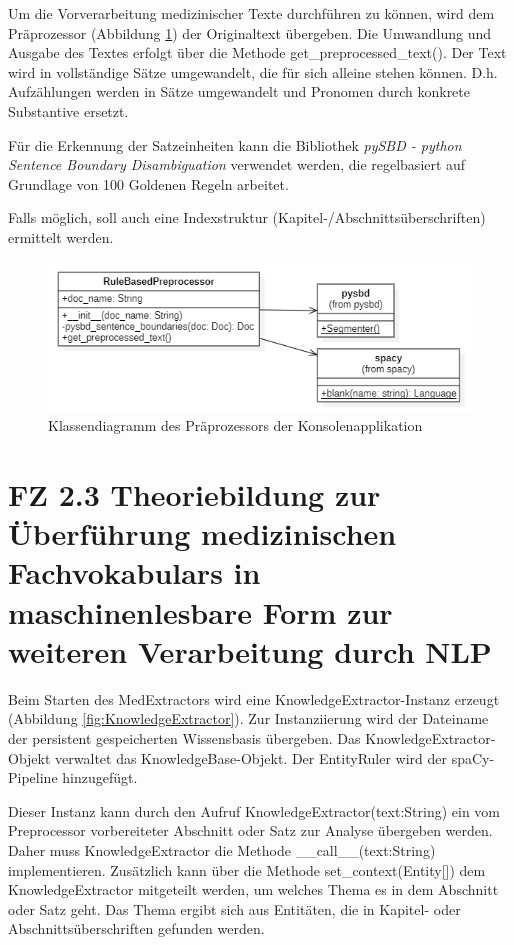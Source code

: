 Um die Vorverarbeitung medizinischer Texte durchführen zu können, wird dem Präprozessor (Abbildung \ref{fig:preprocessor}) der Originaltext übergeben. Die Umwandlung und Ausgabe des Textes erfolgt über die Methode get\_preprocessed\_text(). Der Text wird in vollständige Sätze umgewandelt, die für sich alleine stehen können. D.h. Aufzählungen werden in Sätze umgewandelt und Pronomen durch konkrete Substantive ersetzt. 

Für die Erkennung der Satzeinheiten kann die Bibliothek \emph{pySBD - python Sentence Boundary Disambiguation} verwendet werden, die regelbasiert auf Grundlage von 100 \glqq Goldenen Regeln\grqq{} arbeitet.

Falls möglich, soll auch eine Indexstruktur (Kapitel-/Abschnittsüberschrif\-ten) ermittelt werden.

\begin{figure}[h]
    \centering
    \includegraphics[width=\textwidth]{pictures/RuleBasedPreprocessor.png}
    \caption{Klassendiagramm des Präprozessors der Konsolenapplikation}
    \label{fig:preprocessor}
\end{figure}

\section[FZ 2.3 Theoriebildung zur Überf. med.Fachvokabulars]{FZ 2.3 Theoriebildung zur Überführung medizinischen Fachvokabulars in maschinenlesbare Form zur weiteren Verarbeitung durch NLP}
\label{sec:FZ2.3} 

Beim Starten des MedExtractors wird eine KnowledgeExtractor-Instanz erzeugt (Abbildung \ref{fig:KnowledgeExtractor}). Zur Instanziierung wird der Dateiname der persistent gespeicherten Wissensbasis übergeben. Das KnowledgeExtractor-Objekt verwaltet das KnowledgeBase-Objekt. Der EntityRuler wird der spaCy-Pipeline hinzugefügt.

Dieser Instanz kann durch den Aufruf KnowledgeExtractor(text:String) ein vom Preprocessor vorbereiteter Abschnitt oder Satz zur Analyse übergeben werden. Daher muss KnowledgeExtractor die Methode \_\_call\_\_(text:String) implementieren. Zusätzlich kann über die Methode set\_context(Entity[]) dem KnowledgeExtractor mitgeteilt werden, um welches Thema es in dem Abschnitt oder Satz geht. Das Thema ergibt sich aus Entitäten, die in Kapitel- oder Abschnittsüberschriften gefunden werden.

